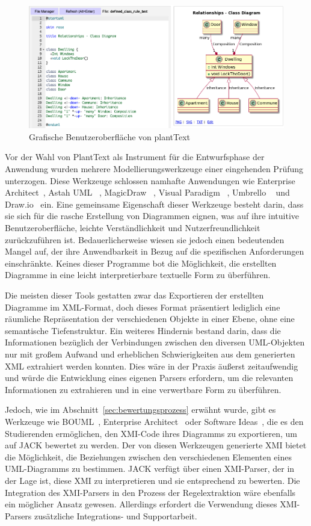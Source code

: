 \begin{figure}
    \centering
    \includegraphics[width=13cm]{images/plantText}
    \caption{Grafische Benutzeroberfläche von plantText}
    \label{fig:plant-text}
\end{figure}

Vor der Wahl von PlantText als Instrument für die Entwurfsphase der Anwendung wurden mehrere Modellierungswerkzeuge
einer eingehenden Prüfung unterzogen. Diese Werkzeuge schlossen namhafte Anwendungen wie Enterprise Architect~\cite{enterarch},
Astah UML ~\cite{astah}, MagicDraw ~\cite{magic}, Visual Paradigm ~\cite{visual}, Umbrello ~\cite{umbrello} und Draw.io~\cite{draw} ein.
Eine gemeinsame Eigenschaft dieser Werkzeuge besteht darin, dass sie sich für die rasche Erstellung von Diagrammen
eignen, was auf ihre intuitive Benutzeroberfläche, leichte Verständlichkeit und Nutzerfreundlichkeit zurückzuführen ist.
Bedauerlicherweise wiesen sie jedoch einen bedeutenden Mangel auf, der ihre Anwendbarkeit in Bezug auf die spezifischen
Anforderungen einschränkte. Keines dieser Programme bot die Möglichkeit, die erstellten Diagramme in eine
leicht interpretierbare textuelle Form zu überführen.

Die meisten dieser Tools gestatten zwar das Exportieren der erstellten Diagramme im XML-Format, doch dieses Format
präsentiert lediglich eine räumliche Repräsentation der verschiedenen Objekte in einer Ebene, ohne eine semantische
Tiefenstruktur. Ein weiteres Hindernis bestand darin, dass die Informationen bezüglich der Verbindungen zwischen den
diversen UML-Objekten nur mit großem Aufwand und erheblichen Schwierigkeiten aus dem generierten XML extrahiert werden
konnten. Dies wäre in der Praxis äußerst zeitaufwendig und würde die Entwicklung eines eigenen Parsers erfordern, um die
relevanten Informationen zu extrahieren und in eine verwertbare Form zu überführen.


Jedoch, wie im Abschnitt~\ref{sec:bewertungsprozess} erwähnt wurde, gibt es Werkzeuge wie BOUML~\cite{bouml},
Enterprise Architect~\cite{enterarch} oder Software Ideas~\cite{sim}, die es den Studierenden ermöglichen, den XMI-Code
ihres Diagramms zu exportieren, um auf JACK bewertet zu werden. Der von diesen Werkzeugen generierte XMI bietet die
Möglichkeit, die Beziehungen zwischen den verschiedenen Elementen eines UML-Diagramms zu bestimmen. JACK verfügt über
einen XMI-Parser, der in der Lage ist, diese XMI zu interpretieren und sie entsprechend zu bewerten. Die Integration des
XMI-Parsers in den Prozess der Regelextraktion wäre ebenfalls ein möglicher Ansatz gewesen. Allerdings erfordert die
Verwendung dieses XMI-Parsers zusätzliche Integrations- und Supportarbeit.


